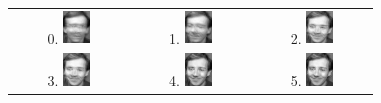 \documentclass[10pt,a4paper]{article}
\begin{document}
\begin{figure}[h!]
  \begin{tabular}{ c c c }
    0. \includegraphics[width=0.25\textwidth]{PartialReconstruction0.jpg} & 1. \includegraphics[width=0.25\textwidth]{PartialReconstruction1.jpg} & 2. \includegraphics[width=0.25\textwidth]{PartialReconstruction2.jpg} \\
    3. \includegraphics[width=0.25\textwidth]{PartialReconstruction3.jpg} & 4. \includegraphics[width=0.25\textwidth]{PartialReconstruction4.jpg} & 5. \includegraphics[width=0.25\textwidth]{PartialReconstruction5.jpg} \\

\end{tabular}
\end{figure}
\end{document}
